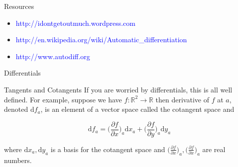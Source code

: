 \documentclass{beamer}
\begin{document}
\begin{frame}[fragile]{Resources}
\begin{itemize}
\item \textcolor{blue}{http://idontgetoutmuch.wordpress.com}
\item
  \textcolor{blue}{http://en.wikipedia.org/wiki/Automatic\_differentiation}
\item \textcolor{blue}{http://www.autodiff.org}
\end{itemize}
\end{frame}

\begin{frame}[fragile]{Differentials}
\end{frame}

\begin{frame}[fragile]{Tangents and Cotangents}
  If you are worried by differentials, this is all well defined. For
  example, suppose we have $f : \mathbb{R}^2 \rightarrow \mathbb{R}$
  then derivative of $f$ at $a$, denoted $\mathrm{d}f_a$, is an
  element of a vector space called the cotangent space and

$$
\mathrm{d}f_a = \bigg(\frac{\partial f}{\partial x}\bigg)_a\mathrm{d}x_a +
                \bigg(\frac{\partial f}{\partial y}\bigg)_a\mathrm{d}y_a
$$

where $\mathrm{d}x_a, \mathrm{d}y_a$ is a basis for the cotangent
space and $\big(\frac{\partial f}{\partial x}\big)_a,
\big(\frac{\partial f}{\partial x}\big)_a$ are real numbers.
\end{frame}
\end{document}
